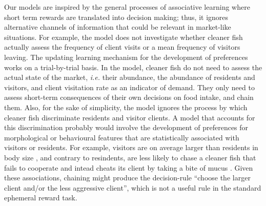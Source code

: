 \documentclass[]{rsos}%
\begin{document}
Our models are inspired by the general processes of associative learning
where short term rewards are translated into decision making; thus, it
ignores alternative channels of information that could be relevant in
market-like situations. For example, the model does not investigate whether
cleaner fish actually assess the frequency of client visits or a mean frequency
of visitors leaving. The updating learning mechanism for the development
of preferences works on a trial-by-trial basis. In the model, cleaner fish
do not need to assess the actual state of the market, \emph{i.e.} their abundance,
the abundance of residents and visitors, and client visitation rate as an
indicator of demand. They only need to assess short-term consequences of their
own decisions on food intake, and chain them. Also, for the sake of
simplicity, the model ignores the process by which cleaner fish discriminate
residents and visitor clients. A model that accounts for this discrimination
probably would involve the development of preferences for morphological or
behavioural features that are statistically associated with visitors
or residents. For example, visitors are on average larger
than residents in body size \citep{bshary_Cleaner_2001a}, and contrary to
resindents, are less likely to chase a cleaner fish that fails to cooperate
and intead cheats its client by taking a bite of mucus
\citep{bshary_Asymmetric_2002}. Given these associations, chaining might
produce the decision-rule ``choose the larger client and/or the less aggressive
client'', which is not a useful rule in the standard ephemeral reward task.
\end{document}
